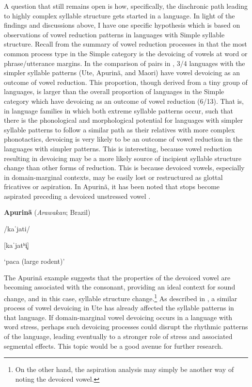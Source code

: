   A question that still remains open is how, specifically, the diachronic path leading to highly complex syllable structure gets started in a language. In light of the findings and discussions above, I have one specific hypothesis which is based on observations of vowel reduction patterns in languages with Simple syllable structure. Recall from the summary of vowel reduction processes in  that the most common process type in the Simple category is the devoicing of vowels at word or phrase/utterance margins. In the comparison of pairs in , 3/4 languages with the simpler syllable patterns (Ute, Apurinã, and Maori) have vowel devoicing as an outcome of vowel reduction. This proportion, though derived from a tiny group of languages, is larger than the overall proportion of languages in the Simple category which have devoicing as an outcome of vowel reduction (6/13). That is, in language families in which both extreme syllable patterns occur, such that there is the phonological and morphological potential for languages with simpler syllable patterns to follow a similar path as their relatives with more complex phonotactics, devoicing is very likely to be an outcome of vowel reduction in the languages with simpler patterns. This is interesting, because vowel reduction resulting in devoicing may be a more likely source of incipient syllable structure change than other forms of reduction. This is because devoiced vowels, especially in domain-marginal contexts, may be easily lost or restructured as glottal fricatives or aspiration. In Apurinã, it has been noted that stops become aspirated preceding a devoiced unstressed vowel .

\ea\label{ex:(8.6)}
  \textbf{Apurinã} (\textit{Arawakan}; Brazil)

/kaˈjati/

[kaˈjatʰi̥]

\glt ‘paca (large rodent)’

\citep[60-1]{Facundes2000} 
\z

  The Apurinã example suggests that the properties of the devoiced vowel are becoming associated with the consonant, providing an ideal context for sound change, and in this case, syllable structure change.\footnote{ \textrm{On the other hand, the aspiration analysis may simply be another way of noting the devoiced vowel.}} As described in , a similar process of vowel devoicing in Ute has already affected the syllable patterns in that language. If domain-marginal vowel devoicing occurs in a language with word stress, perhaps such devoicing processes could disrupt the rhythmic patterns of the language, leading eventually to a stronger role of stress and associated segmental effects. This topic would be a good avenue for further research.

